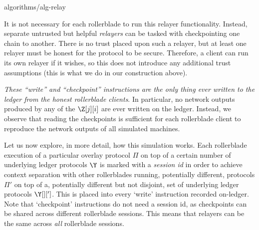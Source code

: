 {algorithms/alg-relay}

It is not necessary for each rollerblade to run this relayer functionality. Instead,
separate untrusted but helpful \emph{relayers} can be tasked with checkpointing one
chain to another. There is no trust placed upon such a relayer, but at least one relayer
must be honest for the protocol to be secure. Therefore, a \rollerblade client can run its
own relayer if it wishes, so this does not introduce any additional trust assumptions
(this is what we do in our construction above).

\emph{These ``write'' and ``checkpoint'' instructions are the only thing ever written
to the ledger from the honest rollerblade clients}. In particular, no network outputs
produced by any of the $\Z[j][i]$ are ever written on the ledger. Instead, we observe
that reading the checkpoints is sufficient for each rollerblade client to reproduce
the network outputs of all simulated machines.

Let us now explore, in more detail, how this simulation works. Each rollerblade execution
of a particular overlay protocol $\Pi$ on top of a certain number of underlying ledger
protocols $\Y$ is marked with a \emph{session id} \sid in order to achieve context
separation with other rollerblades running, potentially different, protocols $\Pi'$
on top of a, potentially different but not disjoint, set of underlying ledger protocols
$\Y[][']$. This \sid is placed into every `write' instruction recorded on-ledger.
Note that `checkpoint' instructions do not need a session id, as checkpoints can be
shared across different rollerblade sessions. This means that relayers can be the
same across \emph{all} rollerblade sessions.

